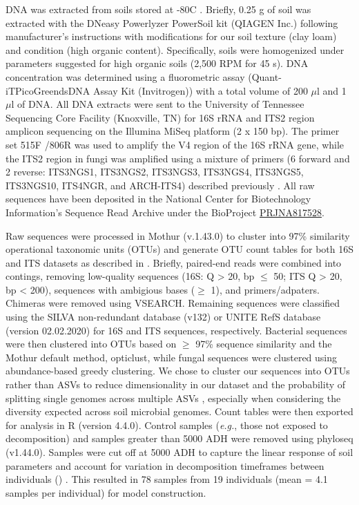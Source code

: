 \documentclass[
  10pt,
  letterpaper,
]{article}
\begin{document}
DNA was extracted from soils stored at -80\textdegree C
\citep{mason_body_2022}. Briefly, 0.25 g of soil was extracted with the
DNeasy Powerlyzer PowerSoil kit (QIAGEN Inc.) following manufacturer's
instructions with modifications for our soil texture (clay loam) and
condition (high organic content). Specifically, soils were homogenized
under parameters suggested for high organic soils (2,500 RPM for 45 s).
DNA concentration was determined using a fluorometric assay
(Quant-iT\texttrademark  PicoGreen\textregistered  dsDNA Assay Kit
(Invitrogen)) with a total volume of 200 \(\mu\)l and 1 \(\mu\)l of DNA.
All DNA extracts were sent to the University of Tennessee Sequencing
Core Facility (Knoxville, TN) for 16S rRNA and ITS2 region amplicon
sequencing on the Illumina MiSeq platform (2 x 150 bp). The primer set
515F \citep{parada_every_2016} /806R \citep{apprill_minor_2015} was used
to amplify the V4 region of the 16S rRNA gene, while the ITS2 region in
fungi was amplified using a mixture of primers (6 forward and 2 reverse:
ITS3NGS1, ITS3NGS2, ITS3NGS3, ITS3NGS4, ITS3NGS5, ITS3NGS10, ITS4NGR,
and ARCH-ITS4) described previously \citep{cregger_populus_2018}. All
raw sequences have been deposited in the National Center for
Biotechnology Information's Sequence Read Archive under the BioProject
\href{https://www.ncbi.nlm.nih.gov/bioproject/?term=PRJNA817528}{PRJNA817528}.

Raw sequences were processed in Mothur \citep{schloss_introducing_2009}
(v.1.43.0) to cluster into 97\% similarity operational taxonomic units
(OTUs) and generate OTU count tables for both 16S and ITS datasets as
described in \citep{mason_body_2022}. Briefly, paired-end reads were
combined into contings, removing low-quality sequences (16S: Q
\textgreater{} 20, bp \(\leq\) 50; ITS Q \textgreater{} 20, bp
\textless{} 200), sequences with ambigious bases (\(\geq\) 1), and
primers/adpaters. Chimeras were removed using VSEARCH. Remaining
sequences were classified using the SILVA non-redundant database
\citep{quast_silva_2013} (v132) or UNITE RefS database
\citep{abarenkov_unite_2020} (version 02.02.2020) for 16S and ITS
sequences, respectively. Bacterial sequences were then clustered into
OTUs based on \(\geq\) 97\% sequence similarity and the Mothur default
method, opticlust, while fungal sequences were clustered using
abundance-based greedy clustering. We chose to cluster our sequences
into OTUs rather than ASVs to reduce dimensionality in our dataset and
the probability of splitting single genomes across multiple ASVs
\citep{patrick_d_schloss_amplicon_2021}, especially when considering the
diversity expected across soil microbial genomes. Count tables were then
exported for analysis in R (version 4.4.0). Control samples
(\emph{e.g.}, those not exposed to decomposition) and samples greater
than 5000 ADH were removed using phyloseq \citep{mcmurdie_phyloseq_2013}
(v1.44.0). Samples were cut off at 5000 ADH to capture the linear
response of soil parameters and account for variation in decomposition
timeframes between individuals ()
\citep{mason_body_2022}. This resulted in 78 samples from 19 individuals
(mean = 4.1 samples per individual) for model construction.
\end{document}
